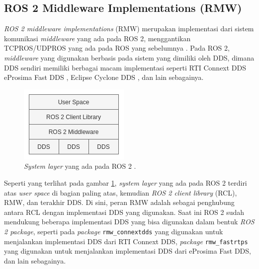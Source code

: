 \subsection{ROS 2 Middleware Implementations (RMW)}
\label{subsec:rmw}

\emph{ROS 2 middleware implementations} (RMW) merupakan implementasi dari sistem komunikasi \emph{middleware} yang ada pada ROS 2,
  menggantikan TCPROS/UDPROS yang ada pada ROS yang sebelumnya \citep{url:rmwdesign}.
Pada ROS 2, \emph{middleware} yang digunakan berbasis pada sistem yang dimiliki oleh DDS,
  dimana DDS sendiri memiliki berbagai macam implementasi seperti RTI Connext DDS \citep{url:rmwdesign} eProsima Fast DDS \citep{url:fastdds},
  Eclipse Cyclone DDS \citep{url:cyclonedds},
  dan lain sebagainya.

\begin{figure}[ht]
  \centering
  \includegraphics[scale=0.55]{gambar/layer-sistem-ros2.png}
  \caption{\emph{System layer} yang ada pada ROS 2 \citep{url:rmwdesign}.}
  \label{fig:layersistemros2}
\end{figure}

Seperti yang terlihat pada gambar \ref{fig:layersistemros2},
  \emph{system layer} yang ada pada ROS 2 terdiri atas \emph{user space} di bagian paling atas,
  kemudian \emph{ROS 2 client library} (RCL), RMW, dan terakhir DDS.
Di sini, peran RMW adalah sebagai penghubung antara RCL dengan implementasi DDS yang digunakan.
Saat ini ROS 2 sudah mendukung beberapa implementasi DDS yang bisa digunakan dalam bentuk \emph{ROS 2 package},
  seperti pada \emph{package} \lstinline{rmw_connextdds} yang digunakan untuk menjalankan implementasi DDS dari RTI Connext DDS,
  \emph{package} \lstinline{rmw_fastrtps} yang digunakan untuk menjalankan implementasi DDS dari eProsima Fast DDS,
  dan lain sebagainya.

